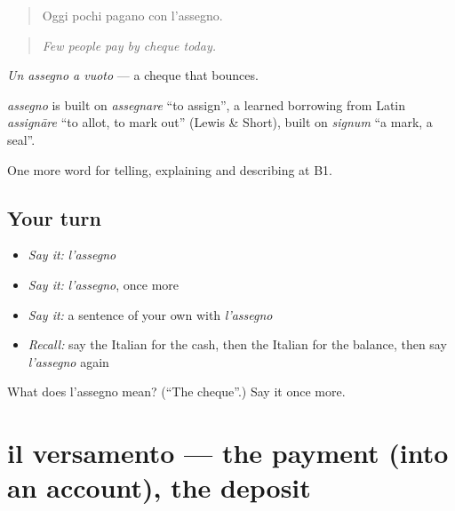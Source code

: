 \begin{quote}
Oggi pochi pagano con l'assegno.
\end{quote}

\begin{quote}
\emph{Few people pay by cheque today.}
\end{quote}

\emph{Un assegno a vuoto} — a cheque that bounces.

\begin{cousinweb}
\emph{assegno} is built on \emph{assegnare} \textquotedblleft{}to assign\textquotedblright{}, a learned borrowing from Latin \emph{assignāre} \textquotedblleft{}to allot, to mark out\textquotedblright{} (Lewis \& Short), built on \emph{signum} \textquotedblleft{}a mark, a seal\textquotedblright{}.
\end{cousinweb}

\begin{grammarlens}[title={What you've built}]
One more word for telling, explaining and describing at B1.
\end{grammarlens}

\subsection*{Your turn}
\begin{itemize}
\raggedright
  \item \emph{Say it:} \emph{l'assegno}
  \item \emph{Say it:} \emph{l'assegno}, once more
  \item \emph{Say it:} a sentence of your own with \emph{l'assegno}
  \item \emph{Recall:} say the Italian for the cash, then the Italian for the balance, then say \emph{l'assegno} again
\end{itemize}

\begin{tcolorbox}[breakable,colback=teal!4,colframe=teal!35!black,title={Before you move on}]
What does l'assegno mean? (\textquotedblleft{}The cheque\textquotedblright{}.) Say it once more.
\end{tcolorbox}
\section[il versamento]{il versamento — the payment (into an account), the deposit}

\label{lesson:IT-C396-versamento}



